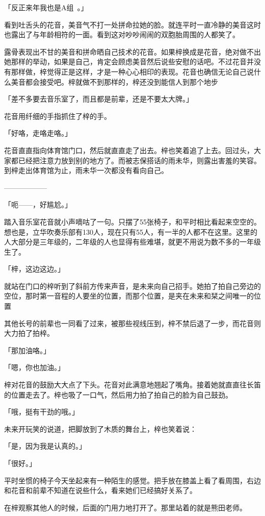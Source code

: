 \documentclass[UTF8]{ctexart}
\begin{document}
    「反正来年我也是A组~。」

    看到吐舌头的花音，美音气不打一处拼命拉她的脸。就连平时一直冷静的美音这时也露出了与年龄相符的一面。看到这对吵吵闹闹的双胞胎周围的人都笑了。

    露骨表现出不甘的美音和拼命晒自己技术的花音。如果梓换成是花音，绝对做不出她那样的举动，如果是自己，肯定会顾虑美音然后说些安慰的话吧。不过花音并没有那样做，梓觉得正是这样，才是一种心心相印的表现。花音也确信无论自己说什么美音都会接受吧。梓就做不到那样的，梓还没到能信人到那个地步

    「差不多要去音乐室了，而且都是前辈，还是不要太大牌。」

    花音用纤细的手指抓住了梓的手。

    「好咯，走咯走咯。」

    花音直直指向体育馆门口，然后就直直走了出去。梓也笑着追了上去。回过头，大家都已经把注意力放到别的地方了。而被志保搭话的雨未华，则露出害羞的笑容。到梓走出体育馆为止，雨未华一次都没有看向自己。

    ——————

    「呃——，好尴尬。」

    踏入音乐室花音就小声嘀咕了一句。只摆了55张椅子，和平时相比看起来空空的。想也是，立华吹奏乐部有130人，现在只有55人，有一半的人都不在这里。这里的人大部分是三年级的，二年级的人也显得有些难堪，就更不用说为数不多的一年级生了。

    「梓，这边这边。」

    就站在门口的梓听到了斜前方传来声音，是未来向自己招手。她拍了拍自己旁边的空位，那时第一音程的人要坐的位置，而那个位置，是夹在未来和栞之间唯一的位置

    其他长号的前辈也一同看了过来，被那些视线压到，梓不禁后退了一步，而花音则大力拍了拍梓。

    「那加油咯。」

    「嗯，你也加油。」

    梓对花音的鼓励大大点了下头。花音对此满意地翘起了嘴角。接着她就直直往长笛的位置走去了。梓也吸了一口气，然后用力拍了拍自己的脸为自己鼓劲。

    「哦，挺有干劲的哦。」

    未来开玩笑的说道，把脚放到了木质的舞台上，梓也笑着说：

    「是，因为我是认真的。」

    「很好。」

    平时坐惯的椅子今天坐起来有一种陌生的感觉。把手放在膝盖上看了看周围，右边和花音和前辈不知道在说些什么，看来她们已经搞好关系了。

    在梓观察其他人的时候，后面的门用力地打开了。那里站着的就是熊田老师。
\end{document}
